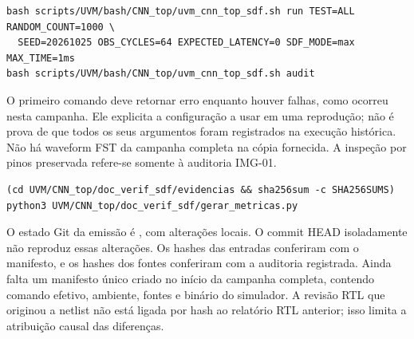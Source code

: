 \documentclass[12pt,a4paper]{article}
\newcommand{\arquivo}[1]{\texttt{\detokenize{#1}}}
\begin{document}
\begin{lstlisting}[caption={Reprodução da campanha e da auditoria, a partir da raiz do repositório.}]
bash scripts/UVM/bash/CNN_top/uvm_cnn_top_sdf.sh run TEST=ALL RANDOM_COUNT=1000 \
  SEED=20261025 OBS_CYCLES=64 EXPECTED_LATENCY=0 SDF_MODE=max MAX_TIME=1ms
bash scripts/UVM/bash/CNN_top/uvm_cnn_top_sdf.sh audit
\end{lstlisting}
O primeiro comando deve retornar erro enquanto houver falhas, como ocorreu nesta campanha. Ele explicita a configuração a usar em uma reprodução; não é prova de que todos os seus argumentos foram registrados na execução histórica. Não há waveform FST da campanha completa na cópia fornecida. A inspeção por pinos preservada refere-se somente à auditoria IMG-01.

\begin{lstlisting}[caption={Reconciliar as evidências congeladas e conferir sua integridade.}]
(cd UVM/CNN_top/doc_verif_sdf/evidencias && sha256sum -c SHA256SUMS)
python3 UVM/CNN_top/doc_verif_sdf/gerar_metricas.py
\end{lstlisting}

O estado Git da emissão é \arquivo{FEAT--SDF--SIMU--UVM}, com alterações locais. O commit HEAD isoladamente não reproduz essas alterações. Os hashes das entradas conferiram com o manifesto, e os hashes dos fontes conferiram com a auditoria registrada. Ainda falta um manifesto único criado no início da campanha completa, contendo comando efetivo, ambiente, fontes e binário do simulador. A revisão RTL que originou a netlist não está ligada por hash ao relatório RTL anterior; isso limita a atribuição causal das diferenças.
\end{document}
